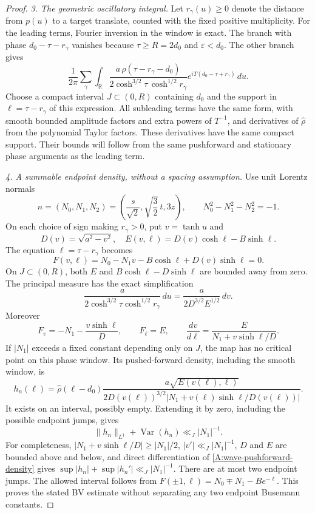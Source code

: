 \begin{proof}
\emph{3. The geometric oscillatory integral.}
Let $r_\gamma(u)\geq0$ denote the distance from $p(u)$ to a
target translate, counted with the fixed positive multiplicity.
For the leading terms, Fourier inversion in the window is exact.
The branch with phase $d_0-\tau-r_\gamma$ vanishes because
$\tau\geq R=2d_0$ and $\varepsilon<d_0$.
The other branch gives
\begin{equation}\label{A:wave-leading-integral}
 \frac1{2\pi}\sum_\gamma
 \int_{\mathbb R}
 \frac{a\,\widehat\rho(\tau-r_\gamma-d_0)}
      {2\cosh^{3/2}\tau\,\cosh^{1/2}r_\gamma}
       e^{iT(d_0-\tau+r_\gamma)}\,du.
\end{equation}
Choose a compact interval
$J\subset(0,R)$ containing $d_0$ and the support in
$\ell=\tau-r_\gamma$ of this expression.
All subleading terms have the same form, with smooth bounded
amplitude factors and extra powers of $T^{-1}$, and derivatives
of $\widehat\rho$ from the polynomial Taylor factors.
These derivatives have the same compact support.
Their bounds will follow from the same pushforward and stationary
phase arguments as the leading term.

\emph{4. A summable endpoint density, without a spacing assumption.}
Use unit Lorentz normals
\[
 n=(N_0,N_1,N_2)
   =\left(\frac{s}{\sqrt2},\sqrt{\frac32}\,t,3z\right),
 \qquad N_0^2-N_1^2-N_2^2=-1.
\]
On each choice of sign making $r_\gamma>0$, put $v=\tanh u$ and
\[
 D(v)=\sqrt{a^2-v^2},\quad
 E(v,\ell)=D(v)\cosh\ell-B\sinh\ell.
\]
The equation $\ell=\tau-r_\gamma$ becomes
\begin{equation}\label{A:wave-phase-equation}
 F(v,\ell)=N_0-N_1v-B\cosh\ell+D(v)\sinh\ell=0.
\end{equation}
On $J\subset(0,R)$, both $E$ and
$B\cosh\ell-D\sinh\ell$ are bounded away from zero.
The principal measure has the exact simplification
\[
 \frac{a}{2\cosh^{3/2}\tau\cosh^{1/2}r_\gamma}\,du
       =\frac{a}{2D^{3/2}E^{1/2}}\,dv .
\]
Moreover
\[
 F_v=-N_1-\frac{v\sinh\ell}{D},\qquad
 F_\ell=E,\qquad
 \frac{dv}{d\ell}
     =\frac{E}{N_1+v\sinh\ell/D}.
\]
If $|N_1|$ exceeds a fixed constant depending only on $J$,
the map has no critical point on this phase window.
Its pushed-forward density, including the smooth window, is
\begin{equation}\label{A:wave-pushforward-density}
 h_n(\ell)=
 \widehat\rho(\ell-d_0)
 \frac{a\sqrt{E(v(\ell),\ell)}}
      {2D(v(\ell))^{3/2}
       |N_1+v(\ell)\sinh\ell/D(v(\ell))|}.
\end{equation}
It exists on an interval, possibly empty. Extending it by zero,
including the possible endpoint jumps, gives
\[
 \|h_n\|_{L^1}+\operatorname{Var}(h_n)\ll_J |N_1|^{-1}.
\]
For completeness, $|N_1+v\sinh\ell/D|\geq |N_1|/2$,
$|v'|\ll_J|N_1|^{-1}$, $D$ and $E$ are bounded above and below,
and direct differentiation of \eqref{A:wave-pushforward-density}
gives $\sup|h_n|+\sup|h_n'|\ll_J|N_1|^{-1}$.
There are at most two endpoint jumps.
The allowed interval follows from
$F(\pm1,\ell)=N_0\mp N_1-Be^{-\ell}$.
This proves the stated BV estimate without separating any
two endpoint Busemann constants.


\end{proof}

